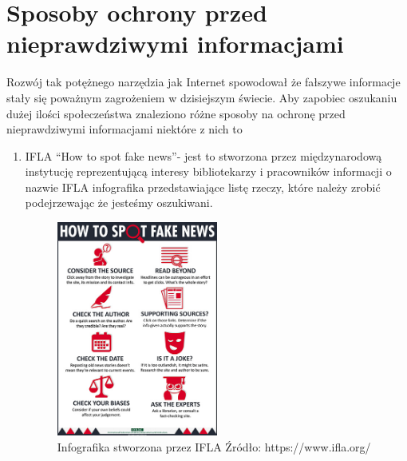 \section{Sposoby ochrony przed nieprawdziwymi informacjami}
Rozwój tak potężnego narzędzia jak Internet spowodował że fałszywe informacje
stały się poważnym zagrożeniem  w dzisiejszym świecie. Aby zapobiec oszukaniu 
dużej ilości społeczeństwa znaleziono różne sposoby na ochronę przed nieprawdziwymi
informacjami niektóre z nich to 
\begin{enumerate}
    \item IFLA ``How to spot fake news''- jest to stworzona przez międzynarodową instytucję
    reprezentującą interesy bibliotekarzy i pracowników informacji o nazwie IFLA infografika
    przedstawiające listę rzeczy, które należy zrobić podejrzewając że jesteśmy oszukiwani.

    \begin{figure}[h!]
        \centering
        \includegraphics[width=0.5\textwidth]{./Img/how-to-spot-fake-news.jpg}
        \caption{Infografika stworzona przez IFLA Źródło: https://www.ifla.org/}
    \end{figure}


\end{enumerate}
